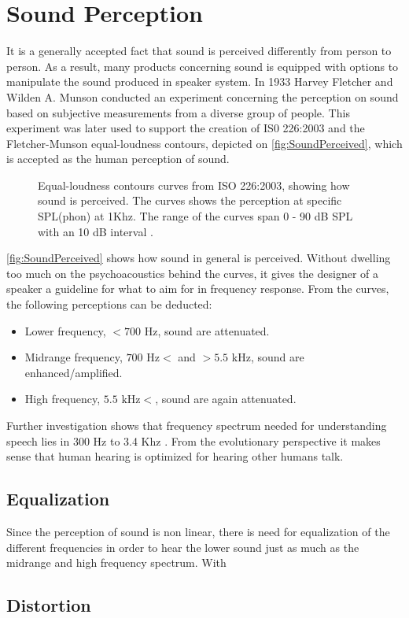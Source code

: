 \section{Sound Perception}

It is a generally accepted fact that sound is perceived differently from person to person. As a result, many products concerning sound is equipped with options to manipulate the sound produced in speaker system. In 1933 Harvey Fletcher and Wilden A. Munson conducted an experiment concerning the perception on sound based on subjective measurements from a diverse group of people. This experiment was later used to support the creation of IS0 226:2003 and the Fletcher-Munson equal-loudness contours, depicted on \autoref{fig:SoundPerceived}, which is accepted as the human perception of sound.

\begin{figure}[H]
\centering
{}

\caption{Equal-loudness contours curves from ISO 226:2003, showing how sound is perceived. The curves shows the perception at specific SPL(phon) at 1Khz. The range of the curves span 0 - 90 dB SPL with an 10 dB interval .}
\label{fig:SoundPerceived}
\end{figure}
\autoref{fig:SoundPerceived} shows how sound in general is perceived. Without dwelling too much on the psychoacoustics behind the curves, it gives the designer of a speaker a guideline for what to aim for in frequency response. From the curves, the following perceptions can be deducted:
\begin{itemize}
\item Lower frequency, $ < 700$ Hz, sound are attenuated.
\item Midrange frequency, $700 \text{ Hz} < $ and $ > 5.5$ kHz, sound are enhanced/amplified.
\item High frequency, $ 5.5 \text{ kHz} < $, sound are again attenuated.
\end{itemize}

Further investigation shows that frequency spectrum needed for understanding speech lies in 300 Hz to 3.4 Khz \citep{sou:VoiceFundamentals}. From the evolutionary perspective it makes sense that human hearing is optimized for hearing other humans talk. 

\subsection{Equalization}
Since the perception of sound is non linear, there is need for equalization of the different frequencies in order to hear the lower sound just as much as the midrange and high frequency spectrum. With   


\subsection{Distortion}





